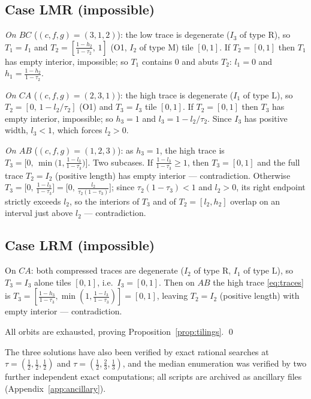 \documentclass[11pt,reqno]{amsart}
\theoremstyle{plain}
\theoremstyle{definition}
\theoremstyle{remark}
\begin{document}
\subsection*{Case LMR \textup(impossible\textup)}
\emph{On $BC$} ($(c,f,g)=(3,1,2)$): the low trace is degenerate ($I_3$ of type
$\mathrm R$), so $T_1=I_1$ and $T_2=[\tfrac{1-h_2}{1-\tau_2},\,1]$ (O1, $I_2$
of type $\mathrm M$) tile $[0,1]$. If $T_2=[0,1]$ then $T_1$ has empty
interior, impossible; so $T_1$ contains $0$ and abuts $T_2$: $l_1=0$ and
$h_1=\tfrac{1-h_2}{1-\tau_2}$.

\emph{On $CA$} ($(c,f,g)=(2,3,1)$): the high trace is degenerate ($I_1$ of type
$\mathrm L$), so $T_2=[0,\,1-l_2/\tau_2]$ (O1) and $T_3=I_3$ tile $[0,1]$. If
$T_2=[0,1]$ then $T_3$ has empty interior, impossible; so $h_3=1$ and
$l_3=1-l_2/\tau_2$. Since $I_3$ has positive width, $l_3<1$, which forces
$l_2>0$.

\emph{On $AB$} ($(c,f,g)=(1,2,3)$): as $h_3=1$, the high trace is
$T_3=\bigl[0,\,\min\bigl(1,\tfrac{1-l_3}{1-\tau_3}\bigr)\bigr]$. Two subcases.
If $\tfrac{1-l_3}{1-\tau_3}\ge1$, then $T_3=[0,1]$ and the full trace
$T_2=I_2$ (positive length) has empty interior --- contradiction. Otherwise
$T_3=\bigl[0,\,\tfrac{1-l_3}{1-\tau_3}\bigr]
=\bigl[0,\,\tfrac{l_2}{\tau_2(1-\tau_3)}\bigr]$; since $\tau_2(1-\tau_3)<1$
and $l_2>0$, its right endpoint strictly exceeds $l_2$, so the interiors of
$T_3$ and of $T_2=[l_2,h_2]$ overlap on an interval just above $l_2$ ---
contradiction.

\subsection*{Case LRM \textup(impossible\textup)}
On $CA$: both compressed traces are degenerate ($I_2$ of type $\mathrm R$,
$I_1$ of type $\mathrm L$), so $T_3=I_3$ alone tiles $[0,1]$, i.e.\
$I_3=[0,1]$. Then on $AB$ the high trace \eqref{eq:traces} is
$T_3=[\tfrac{1-h_3}{1-\tau_3},\min(1,\tfrac{1-l_3}{1-\tau_3})]=[0,1]$, leaving
$T_2=I_2$ (positive length) with empty interior --- contradiction.

\medskip
All orbits are exhausted, proving Proposition~\ref{prop:tilings}. \qed

\medskip
The three solutions have also been verified by exact rational searches at
$\tau=(\tfrac12,\tfrac12,\tfrac12)$ and $\tau=(\tfrac12,\tfrac23,\tfrac13)$,
and the median enumeration was verified by two further independent exact
computations; all scripts are archived as ancillary files
(Appendix~\ref{app:ancillary}).
\end{document}
